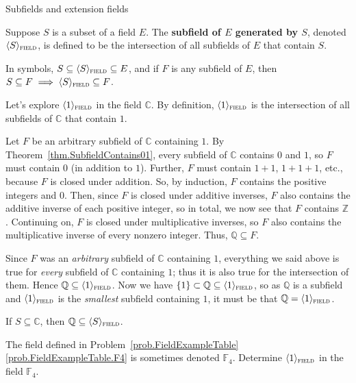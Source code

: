 \begin{section}{Subfields and extension fields}
\begin{definition}\label{def.GenerateField}
Suppose $S$ is a subset of a field $E$. The \textbf{subfield of $E$ generated by $S$}, denoted $\langle S \rangle_{\textsc{field}}$, is defined to be the intersection of all subfields of $E$ that contain $S$.
\end{definition}

In symbols, $S \subseteq \langle S \rangle_{\textsc{field}} \subseteq E$, and if $F$ is any subfield of $E$, then $S\subseteq F\implies \langle S \rangle_{\textsc{field}} \subseteq F$.

\begin{example}\label{exam.GenerateField}
Let's explore  $\langle 1 \rangle_{\textsc{field}}$ in the field $\mathbb{C}$. By definition,  $\langle 1 \rangle_{\textsc{field}}$ is the intersection of all subfields of $\mathbb{C}$ that contain $1$. 

Let $F$ be an arbitrary subfield of $\mathbb{C}$ containing $1$. By Theorem~\ref{thm.SubfieldContains01}, every subfield of $\mathbb{C}$ contains $0$ and $1$, so $F$ must  contain $0$ (in addition to $1$). Further, $F$ must contain $1+1$, $1+1+1$, etc., because $F$ is closed under addition. So, by induction,  $F$ contains the positive integers and $0$. Then, since $F$ is closed under additive inverses, $F$ also contains the additive inverse of each positive integer, so in total, we now see that $F$ contains $\mathbb{Z}$. Continuing on, $F$ is closed under multiplicative inverses, so $F$ also contains the multiplicative inverse of every nonzero integer. Thus, $\mathbb{Q} \subseteq F$. 

Since $F$ was an \emph{arbitrary} subfield of $\mathbb{C}$ containing $1$, everything we said above  is true for \emph{every} subfield of $\mathbb{C}$ containing $1$; thus it is also true for the intersection of them. Hence $\mathbb{Q} \subseteq \langle 1 \rangle_{\textsc{field}}$. Now we have $\{1\} \subset \mathbb{Q} \subseteq \langle 1 \rangle_{\textsc{field}}$, so as $\mathbb{Q}$ is a subfield and $\langle 1 \rangle_{\textsc{field}}$ is the \emph{smallest} subfield containing $1$, it must be that $\mathbb{Q} = \langle 1 \rangle_{\textsc{field}}$.
\end{example}


\begin{theorem}\label{thm.BaseFieldC}
If $S\subseteq \mathbb{C}$, then  $\mathbb{Q} \subseteq \langle S \rangle_{\textsc{field}}$.
\end{theorem}

\begin{problem}
The field defined in Problem~\ref{prob.FieldExampleTable}\ref{prob.FieldExampleTable.F4} is sometimes denoted $\mathbb{F}_4$. Determine $\langle 1 \rangle_{\textsc{field}}$ in the field $\mathbb{F}_4$.
\end{problem}


\end{section}
